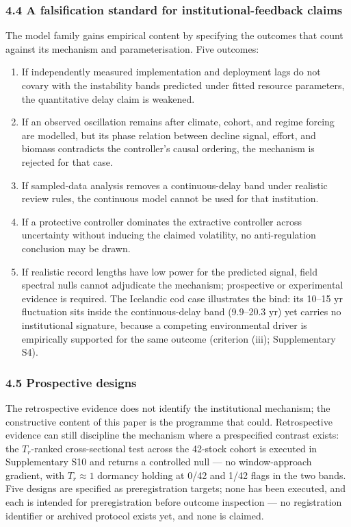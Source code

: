 \documentclass[11pt]{article}
\providecommand{\tightlist}{\setlength{\itemsep}{0pt}\setlength{\parskip}{0pt}}
\begin{document}
\subsubsection{4.4 A falsification standard for institutional-feedback
claims}\label{a-falsification-standard-for-institutional-feedback-claims}

The model family gains empirical content by specifying the outcomes that
count against its mechanism and parameterisation. Five outcomes:

\begin{enumerate}
\def\labelenumi{\arabic{enumi}.}
\tightlist
\item
  If independently measured implementation and deployment lags do not
  covary with the instability bands predicted under fitted resource
  parameters, the quantitative delay claim is weakened.
\item
  If an observed oscillation remains after climate, cohort, and regime
  forcing are modelled, but its phase relation between decline signal,
  effort, and biomass contradicts the controller's causal ordering, the
  mechanism is rejected for that case.
\item
  If sampled-data analysis removes a continuous-delay band under
  realistic review rules, the continuous model cannot be used for that
  institution.
\item
  If a protective controller dominates the extractive controller across
  uncertainty without inducing the claimed volatility, no
  anti-regulation conclusion may be drawn.
\item
  If realistic record lengths have low power for the predicted signal, field spectral nulls cannot adjudicate the mechanism; prospective or experimental evidence is required. The Icelandic cod case illustrates the bind: its 10--15 yr fluctuation sits inside the continuous-delay band (9.9--20.3 yr) yet carries no institutional signature, because a competing environmental driver is empirically supported for the same outcome (criterion (iii); Supplementary S4).
\end{enumerate}

\subsubsection{4.5 Prospective designs}\label{prospective-designs}

The retrospective evidence does not identify the institutional
mechanism; the constructive content of this paper is the programme that
could. Retrospective evidence can still discipline the mechanism where a prespecified contrast exists: the \(T_r\)-ranked cross-sectional test across the 42-stock cohort is executed in Supplementary S10 and returns a controlled null --- no window-approach gradient, with \(T_r \approx 1\) dormancy holding at 0/42 and 1/42 flags in the two bands. Five designs are specified as preregistration targets; none has been executed, and each is intended for preregistration before outcome
inspection --- no registration identifier or archived protocol exists
yet, and none is claimed.
\end{document}
